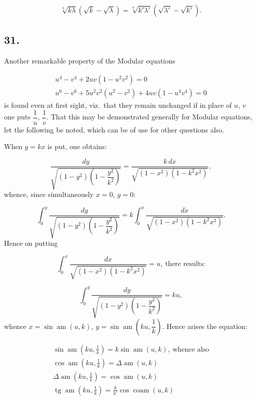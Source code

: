 \documentclass{article}
\begin{document}
\[
\sqrt[4]{k\lambda}\left(\sqrt{k}-\sqrt{\lambda}\right)=\sqrt[4]{k'\lambda'}\left(\sqrt{\lambda'}-\sqrt{k'}\right).
\]

\subsection*{31.}

Another remarkable property of the Modular equations

\[
\begin{gathered}
u^{4}-v^{4}+2uv(1-u^{2}v^{2})=0\\
u^{6}-v^{6}+5u^{2}v^{2}(u^{2}-v^{2})+4uv(1-u^{4}v^{4})=0
\end{gathered}
\]
is found even at first sight, viz.\ that they remain unchanged if in place of $u$, $v$ one puts $\dfrac{1}{u}$, $\dfrac{1}{v}$. That this may be demonstrated generally for Modular equations, let the following be noted, which can be of use for other questions also.

When $y=kx$ is put, one obtains:

\[
\frac{dy}{\sqrt{(1-y^{2})\left(1-\dfrac{y^{2}}{k^{2}}\right)}}=\frac{k\,dx}{\sqrt{(1-x^{2})(1-k^{2}x^{2})}},
\]
whence, since simultaneously $x=0$, $y=0$:

\[
\int_{0}^{y}\frac{dy}{\sqrt{(1-y^{2})\left(1-\dfrac{y^{2}}{k^{2}}\right)}}=k\int_{0}^{x}\frac{dx}{\sqrt{(1-x^{2})(1-k^{2}x^{2})}}.
\]
Hence on putting

\[
\int_{0}^{x}\frac{dx}{\sqrt{(1-x^{2})(1-k^{2}x^{2})}}=u,\ \text{there results:}
\]

\[
\int_{0}^{y}\frac{dy}{\sqrt{(1-y^{2})\left(1-\dfrac{y^{2}}{k^{2}}\right)}}=ku,
\]
whence $x=\sin\operatorname{am}(u,k)$, $y=\sin\operatorname{am}\left(ku,\dfrac{1}{k}\right)$. Hence arises the equation:

\[
\begin{gathered}
\sin\operatorname{am}\left(ku,\frac{1}{k}\right)=k\sin\operatorname{am}(u,k),\ \text{whence also}\\[1.5ex]
\cos\operatorname{am}\left(ku,\frac{1}{k}\right)=\Delta\operatorname{am}(u,k)\\[1.5ex]
\Delta\operatorname{am}\left(ku,\frac{1}{k}\right)=\cos\operatorname{am}(u,k)\\[1.5ex]
\operatorname{tg}\operatorname{am}\left(ku,\frac{1}{k}\right)=\frac{k}{k'}\cos\operatorname{coam}(u,k)
\end{gathered}
\]
\end{document}
